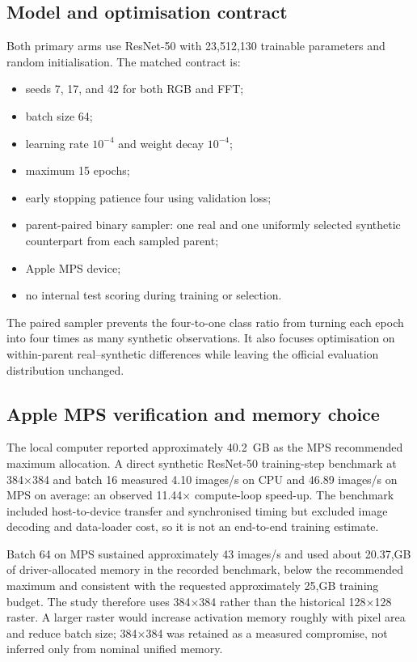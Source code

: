 \documentclass[12pt,a4paper]{article}
\begin{document}
\subsection{Model and optimisation contract}

Both primary arms use ResNet-50 with 23,512,130 trainable parameters and random initialisation.
The matched contract is:

\begin{itemize}
  \item seeds 7, 17, and 42 for both RGB and FFT;
  \item batch size 64;
  \item learning rate $10^{-4}$ and weight decay $10^{-4}$;
  \item maximum 15 epochs;
  \item early stopping patience four using validation loss;
  \item parent-paired binary sampler: one real and one uniformly selected synthetic counterpart
        from each sampled parent;
  \item Apple MPS device;
  \item no internal test scoring during training or selection.
\end{itemize}

The paired sampler prevents the four-to-one class ratio from turning each epoch into four times as
many synthetic observations. It also focuses optimisation on within-parent real--synthetic
differences while leaving the official evaluation distribution unchanged.

\subsection{Apple MPS verification and memory choice}

The local computer reported approximately 40.2~GB as the MPS recommended maximum allocation. A
direct synthetic ResNet-50 training-step benchmark at 384×384 and batch 16 measured 4.10 images/s
on CPU and 46.89 images/s on MPS on average: an observed 11.44× compute-loop speed-up. The benchmark
included host-to-device transfer and synchronised timing but excluded image decoding and data-loader
cost, so it is not an end-to-end training estimate.

Batch 64 on MPS sustained approximately 43 images/s and used about 20.37,GB of driver-allocated
memory in the recorded benchmark, below the recommended maximum and consistent with the requested
approximately 25,GB training budget. The study therefore uses 384×384 rather than the historical
128×128 raster. A larger raster would increase activation memory roughly with pixel area and reduce
batch size; 384×384 was retained as a measured compromise, not inferred only from nominal unified
memory.
\end{document}
